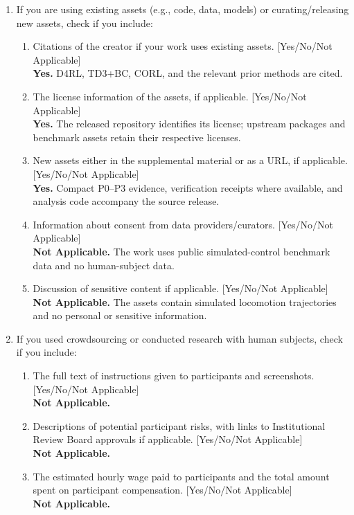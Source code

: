 \begin{enumerate}
\item If you are using existing assets (e.g., code, data, models) or curating/releasing new assets, check if you include:
  \begin{enumerate}
  \item Citations of the creator if your work uses existing assets. [Yes/No/Not Applicable]\\
  \textbf{Yes.} D4RL, TD3+BC, CORL, and the relevant prior methods are cited.
  \item The license information of the assets, if applicable. [Yes/No/Not Applicable]\\
  \textbf{Yes.} The released repository identifies its license; upstream packages and benchmark assets retain their respective licenses.
  \item New assets either in the supplemental material or as a URL, if applicable. [Yes/No/Not Applicable]\\
  \textbf{Yes.} Compact P0--P3 evidence, verification receipts where available, and analysis code accompany the source release.
  \item Information about consent from data providers/curators. [Yes/No/Not Applicable]\\
  \textbf{Not Applicable.} The work uses public simulated-control benchmark data and no human-subject data.
  \item Discussion of sensitive content if applicable. [Yes/No/Not Applicable]\\
  \textbf{Not Applicable.} The assets contain simulated locomotion trajectories and no personal or sensitive information.
  \end{enumerate}

\item If you used crowdsourcing or conducted research with human subjects, check if you include:
  \begin{enumerate}
  \item The full text of instructions given to participants and screenshots. [Yes/No/Not Applicable]\\
  \textbf{Not Applicable.}
  \item Descriptions of potential participant risks, with links to Institutional Review Board approvals if applicable. [Yes/No/Not Applicable]\\
  \textbf{Not Applicable.}
  \item The estimated hourly wage paid to participants and the total amount spent on participant compensation. [Yes/No/Not Applicable]\\
  \textbf{Not Applicable.}
  \end{enumerate}
\end{enumerate}
